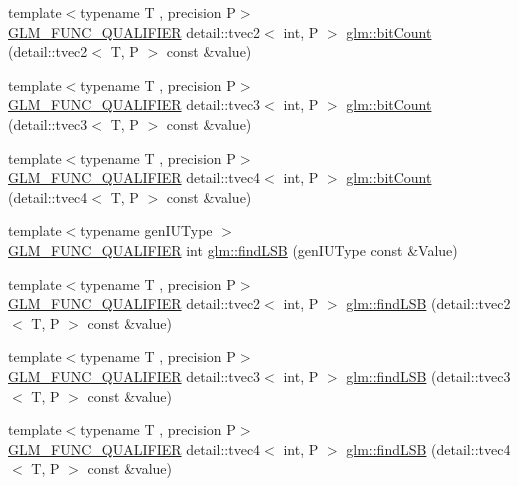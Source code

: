 \begin{DoxyCompactItemize}
\item 
{\footnotesize template$<$typename T , precision P$>$ }\\\hyperlink{setup_8hpp_a33fdea6f91c5f834105f7415e2a64407}{G\+L\+M\+\_\+\+F\+U\+N\+C\+\_\+\+Q\+U\+A\+L\+I\+F\+I\+ER} detail\+::tvec2$<$ int, P $>$ \hyperlink{namespaceglm_a573d6ea294a27e158525a1558eac5492}{glm\+::bit\+Count} (detail\+::tvec2$<$ T, P $>$ const \&value)
\item 
{\footnotesize template$<$typename T , precision P$>$ }\\\hyperlink{setup_8hpp_a33fdea6f91c5f834105f7415e2a64407}{G\+L\+M\+\_\+\+F\+U\+N\+C\+\_\+\+Q\+U\+A\+L\+I\+F\+I\+ER} detail\+::tvec3$<$ int, P $>$ \hyperlink{namespaceglm_a2f5b97b2cca4741488209eac160ef903}{glm\+::bit\+Count} (detail\+::tvec3$<$ T, P $>$ const \&value)
\item 
{\footnotesize template$<$typename T , precision P$>$ }\\\hyperlink{setup_8hpp_a33fdea6f91c5f834105f7415e2a64407}{G\+L\+M\+\_\+\+F\+U\+N\+C\+\_\+\+Q\+U\+A\+L\+I\+F\+I\+ER} detail\+::tvec4$<$ int, P $>$ \hyperlink{namespaceglm_a8c668fc78e5881f3ae8b93a997ce8d22}{glm\+::bit\+Count} (detail\+::tvec4$<$ T, P $>$ const \&value)
\item 
{\footnotesize template$<$typename gen\+I\+U\+Type $>$ }\\\hyperlink{setup_8hpp_a33fdea6f91c5f834105f7415e2a64407}{G\+L\+M\+\_\+\+F\+U\+N\+C\+\_\+\+Q\+U\+A\+L\+I\+F\+I\+ER} int \hyperlink{namespaceglm_a984d0192bd95085d8efb0a1a00a4e6d9}{glm\+::find\+L\+SB} (gen\+I\+U\+Type const \&Value)
\item 
{\footnotesize template$<$typename T , precision P$>$ }\\\hyperlink{setup_8hpp_a33fdea6f91c5f834105f7415e2a64407}{G\+L\+M\+\_\+\+F\+U\+N\+C\+\_\+\+Q\+U\+A\+L\+I\+F\+I\+ER} detail\+::tvec2$<$ int, P $>$ \hyperlink{namespaceglm_ae037356ab3b0ac098723dfe091a93753}{glm\+::find\+L\+SB} (detail\+::tvec2$<$ T, P $>$ const \&value)
\item 
{\footnotesize template$<$typename T , precision P$>$ }\\\hyperlink{setup_8hpp_a33fdea6f91c5f834105f7415e2a64407}{G\+L\+M\+\_\+\+F\+U\+N\+C\+\_\+\+Q\+U\+A\+L\+I\+F\+I\+ER} detail\+::tvec3$<$ int, P $>$ \hyperlink{namespaceglm_a84e800d8d8e6526be81c6f5adcc275a8}{glm\+::find\+L\+SB} (detail\+::tvec3$<$ T, P $>$ const \&value)
\item 
{\footnotesize template$<$typename T , precision P$>$ }\\\hyperlink{setup_8hpp_a33fdea6f91c5f834105f7415e2a64407}{G\+L\+M\+\_\+\+F\+U\+N\+C\+\_\+\+Q\+U\+A\+L\+I\+F\+I\+ER} detail\+::tvec4$<$ int, P $>$ \hyperlink{namespaceglm_a8e4e6525d3aa43da17a5c34b782b6b99}{glm\+::find\+L\+SB} (detail\+::tvec4$<$ T, P $>$ const \&value)

\end{DoxyCompactItemize}
